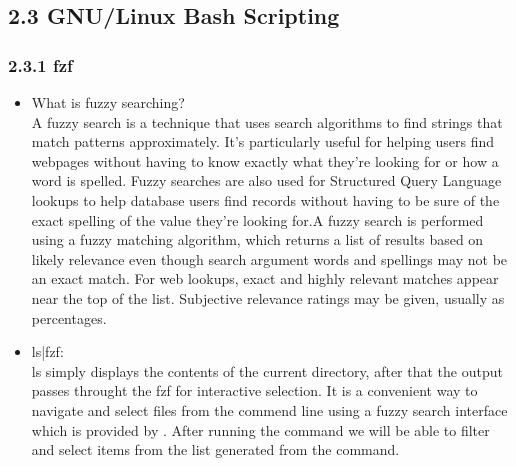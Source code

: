 \documentclass{article}
\begin{document}
\subsection*{\Large 2.3 GNU/Linux Bash Scripting}
\subsubsection*{\large 2.3.1 fzf}
\begin{itemize}
    \item What is fuzzy searching?\\
    A fuzzy search is a technique that uses search algorithms to find strings that match patterns approximately. It's particularly useful for helping users find webpages without having to know exactly what they're looking for or how a word is spelled. Fuzzy searches are also used for Structured Query Language lookups to help database users find records without having to be sure of the exact spelling of the value they're looking for.A fuzzy search is performed using a fuzzy matching algorithm, which returns a list of results based on likely relevance even though search argument words and spellings may not be an exact match. For web lookups, exact and highly relevant matches appear near the top of the list. Subjective relevance ratings may be given, usually as percentages.
    \item ls|fzf:\\
    ls simply displays the contents of the current directory, after that the output passes throught the 
    fzf  for interactive selection. It is a convenient way to navigate and select files from the commend line
    using a fuzzy search interface which is provided by . After running the command we will be able to filter 
    and select items from the list generated from the  command.
\end{itemize}
\end{document}
